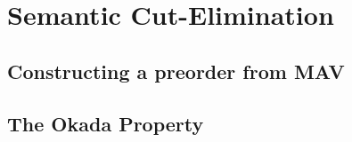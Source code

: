 \section{Semantic Cut-Elimination}\label{sec:mav-cut-elimination}

\subsection{Constructing a preorder from MAV}

\subsection{The Okada Property}

